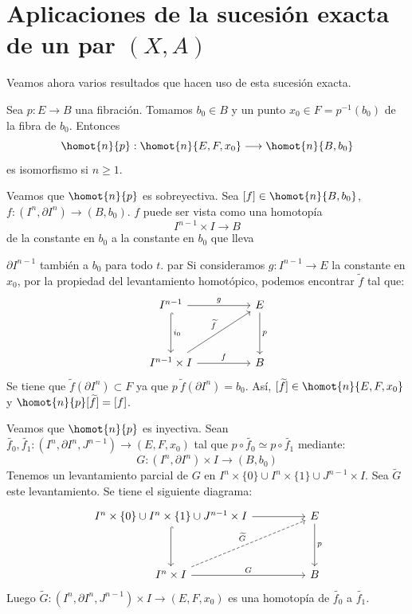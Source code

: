 \section{Aplicaciones de la sucesión exacta de un par $(X,A)$}
Veamos ahora varios resultados que hacen uso de esta sucesión exacta.
\begin{teor}
Sea $p : E \longrightarrow B$ una fibración. Tomamos $b_0 \in B$ y un punto $x_0 \in F = p^{-1}(b_0)$ de la fibra de $b_0$. Entonces
\[
\homot{n}{p} : \homot{n}{E, F, x_0} \longrightarrow \homot{n}{B, b_0}
\]
es isomorfismo si $n \geq 1$.
\end{teor}
\begin{demo}
Veamos que $\homot{n}{p}$ es sobreyectiva. Sea $[f] \in \homot{n}{B, b_0}$, $f: (I^n, \partial I^n) \longrightarrow (B, b_0)$. $f$ puede ser vista como una homotopía
\[
I^{n-1}  \times I \longrightarrow B
\]
de la constante en $b_0$ a la constante en $b_0$ que lleva \par
{}\par
$\partial I^{n-1}$ también a $b_0$ para todo $t$. par
Si consideramos $g: I^{n-1} \longrightarrow E$ la constante en $x_0$, por la propiedad del levantamiento homotópico, podemos encontrar $\widetilde{f}$ tal que:
\[
\begin{tikzcd}
I^{n-1} \arrow{rr}{g} \arrow[hook]{dd}{i_0} & & E \arrow{dd}{p} \\
\\
I^{n-1} \times I \arrow{rr}{f} \arrow{uurr}{\widetilde{f}} & & B
\end{tikzcd}
\]
Se tiene que $\widetilde{f}(\partial I^n) \subset F$ ya que $p \ \widetilde{f}(\partial I^n) = b_0$. Así, $[\widetilde{f}] \in \homot{n}{E, F, x_0}$ y $\homot{n}{p}[\widetilde{f}] = [f]$. \par
Veamos que $\homot{n}{p}$ es inyectiva. Sean $\widetilde{f_0}, \widetilde{f_1} : (I^n, \partial I^n, J^{n-1}) \longrightarrow (E, F, x_0)$ tal que $p \circ \widetilde{f_0} \simeq p \circ \widetilde{f_1}$ mediante:
\[
G: (I^n, \partial I^n) \times I \longrightarrow (B, b_0)
\]
Tenemos un levantamiento parcial de $G$ en $I^n \times \{0\} \cup I^n \times \{1\} \cup J^{n-1} \times I$. Sea $\widetilde{G}$ este levantamiento. Se tiene el siguiente diagrama:
\[
\begin{tikzcd}
I^n \times \{0\} \cup I^n \times \{1\} \cup J^{n-1} \times I \arrow[hook]{dd} \arrow{rr} & & E \arrow{dd}{p} \\
\\
I^n \times I \arrow{rr}{G} \arrow[dashed]{uurr}{\widetilde{G}}& & B
\end{tikzcd}
\]
Luego $\widetilde{G} : (I^n, \partial I^n, J^{n-1}) \times I \longrightarrow (E, F, x_0)$ es una homotopía de $\widetilde{f_0}$ a $\widetilde{f_1}$.
\end{demo}
